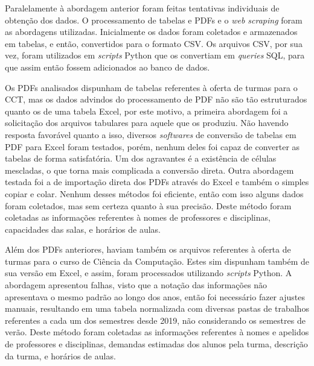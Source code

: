 Paralelamente à abordagem anterior foram feitas tentativas individuais de obtenção dos dados. O processamento de tabelas e PDFs e o \textit{web scraping} foram as abordagens utilizadas. Inicialmente os dados foram coletados e armazenados em tabelas, e então, convertidos para o formato CSV. Os arquivos CSV, por sua vez, foram utilizados em \textit{scripts} Python que os convertiam em \textit{queries} SQL, para que assim então fossem adicionados ao banco de dados.

Os PDFs analisados dispunham de tabelas referentes à oferta de turmas para o CCT, mas os dados advindos do processamento de PDF não são tão estruturados quanto os de uma tabela Excel, por este motivo, a primeira abordagem foi a solicitação dos arquivos tabulares para aquele que os produziu. Não havendo resposta favorável quanto a isso, diversos \textit{softwares} de conversão de tabelas em PDF para Excel foram testados, porém, nenhum deles foi capaz de converter as tabelas de forma satisfatória. Um dos agravantes é a existência de células mescladas, o que torna mais complicada a conversão direta. Outra abordagem testada foi a de importação direta dos PDFs através do Excel e também o simples copiar e colar. Nenhum desses métodos foi eficiente, então com isso alguns dados foram coletados, mas sem certeza quanto à sua precisão. Deste método foram coletadas as informações referentes à nomes de professores e disciplinas, capacidades das salas, e horários de aulas.

Além dos PDFs anteriores, haviam também os arquivos referentes à oferta de turmas para o curso de Ciência da Computação. Estes sim dispunham também de sua versão em Excel, e assim, foram processados utilizando \textit{scripts} Python. A abordagem apresentou falhas, visto que a notação das informações não apresentava o mesmo padrão ao longo dos anos, então foi necessário fazer ajustes manuais, resultando em uma tabela normalizada com diversas pastas de trabalhos referentes a cada um dos semestres desde 2019, não considerando os semestres de verão. Deste método foram coletadas as informações referentes à nomes e apelidos de professores e disciplinas, demandas estimadas dos alunos pela turma, descrição da turma, e horários de aulas.

